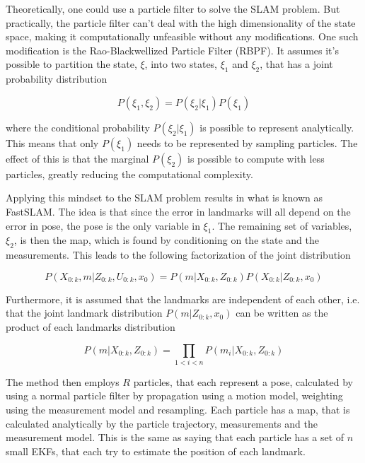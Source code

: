 Theoretically, one could use a particle filter\cite{ParticleFilter} to solve the SLAM problem. But practically, the particle filter can't deal with the high dimensionality of the state space, making it computationally unfeasible without any modifications. One such modification is the Rao-Blackwellized Particle Filter (RBPF)\cite{RBPF}. It assumes it's possible to partition the state, $\xi$, into two states, $\xi_1$ and $\xi_2$, that has a joint probability distribution 

\begin{equation}
    P(\xi_1,\xi_2) = P(\xi_2|\xi_1)P(\xi_1)
\end{equation}

where the conditional probability $P(\xi_2|\xi_1)$ is possible to represent analytically. This means that only $P(\xi_1)$ needs to be represented by sampling particles. The effect of this is that the marginal $P(\xi_2)$ is possible to compute with less particles, greatly reducing the computational complexity. 

Applying this mindset to the SLAM problem results in what is known as FastSLAM\cite{FastSLAM1}. The idea is that since the error in landmarks will all depend on the error in pose, the pose is the only variable in $\xi_1$. The remaining set of variables, $\xi_2$, is then the map, which is found by conditioning on the state and the measurements. This leads to the following factorization of the joint distribution

\begin{equation}
    P(X_{0:k},m|Z_{0:k},U_{0:k},x_0) = P(m|X_{0:k},Z_{0:k})P(X_{0:k}|Z_{0:k},x_0)
\end{equation}

Furthermore, it is assumed that the landmarks are independent of each other, i.e. that the joint landmark distribution $P(m|Z_{0:k},x_0)$ can be written as the product of each landmarks distribution

\begin{equation}
    P(m|X_{0:k},Z_{0:k}) = \prod_{1<i<n}P(m_i|X_{0:k},Z_{0:k})
\end{equation}

The method then employs $R$ particles, that each represent a pose, calculated by using a normal particle filter by propagation using a motion model, weighting using the measurement model and resampling. Each particle has a map, that is calculated analytically by the particle trajectory, measurements and the measurement model. This is the same as saying that each particle has a set of $n$ small EKFs, that each try to estimate the position of each landmark. 

